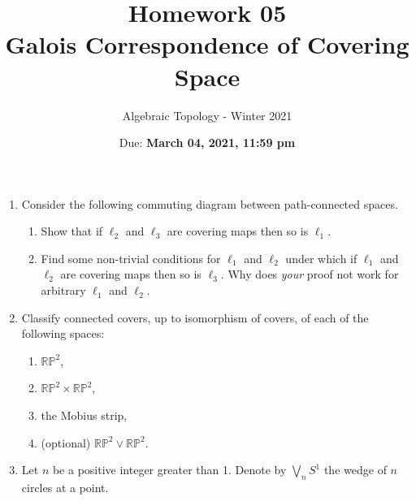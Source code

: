 \documentclass{article}
\title{Homework 05 \\ Galois Correspondence of Covering Space}
\author{Algebraic Topology - Winter 2021}
\date{Due: \textbf{March 04, 2021, 11:59 pm}}
\begin{document}
\maketitle

\begin{enumerate}
\item
  Consider the following commuting diagram between path-connected spaces.
  \begin{center}
  \end{center}
  \begin{enumerate}
  \item Show that if $\ell_2$ and $\ell_3$ are covering maps then so is $\ell_1$.
  \item Find some non-trivial conditions for $\ell_1$ and $\ell_2$ under which if $\ell_1$ and $\ell_2$ are covering
    maps then so is $\ell_3$. Why does \textit{your} proof not work for
    arbitrary $\ell_1$ and $\ell_2$.
  \end{enumerate}
\item Classify connected covers, up to isomorphism of covers, of each of the following
  spaces:
  \begin{enumerate}
  \item $\mathbb{RP}^2$,
  \item $\mathbb{RP}^2 \times \mathbb{RP}^2$,
  \item the Mobius strip,
  \item (optional) $\mathbb{RP}^2 \vee \mathbb{RP}^2$.
  \end{enumerate}
\item
  Let $n$ be a positive integer greater than 1. Denote by $\bigvee
  _{n}S^1$ the wedge of $n$ circles at a point.
  \begin{enumerate}

\end{enumerate}
\end{enumerate}
\end{document}
